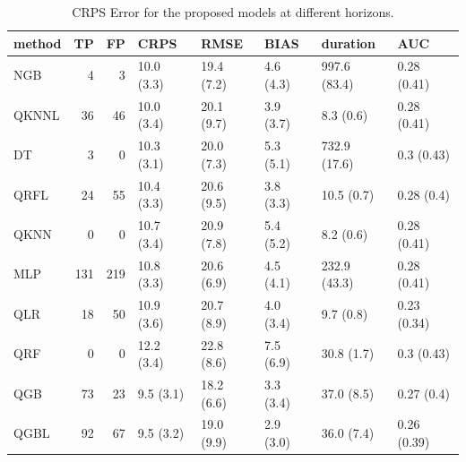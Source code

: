 \documentclass[a4paper,3p,sort&compress]{elsarticle}
\begin{document}
\begin{table}[tbp]
  \centering \footnotesize
  \caption{\label{tab:determ}CRPS Error for the proposed models at different
    horizons.}
    \begin{tabular}{lrrlllll}
      \toprule
        method &  TP &  FP &        CRPS &        RMSE &       BIAS &      duration &          AUC \\
        \midrule
        NGB &             4 &               3 &  10.0 \tiny{(3.3)}&  19.4 \tiny{(7.2)}&  4.6 \tiny{(4.3)}&  997.6 \tiny{(83.4)}&  0.28 \tiny{(0.41)}\\
          QKNNL &            36 &              46 &  10.0 \tiny{(3.4)}&  20.1 \tiny{(9.7)}&  3.9 \tiny{(3.7)}&     8.3 \tiny{(0.6)}&  0.28 \tiny{(0.41)}\\
             DT &             3 &               0 &  10.3 \tiny{(3.1)}&  20.0 \tiny{(7.3)}&  5.3 \tiny{(5.1)}&  732.9 \tiny{(17.6)}&   0.3 \tiny{(0.43)}\\
           QRFL &            24 &              55 &  10.4 \tiny{(3.3)}&  20.6 \tiny{(9.5)}&  3.8 \tiny{(3.3)}&    10.5 \tiny{(0.7)}&   0.28 \tiny{(0.4)}\\
           QKNN &             0 &               0 &  10.7 \tiny{(3.4)}&  20.9 \tiny{(7.8)}&  5.4 \tiny{(5.2)}&     8.2 \tiny{(0.6)}&  0.28 \tiny{(0.41)}\\
            MLP &           131 &             219 &  10.8 \tiny{(3.3)}&  20.6 \tiny{(6.9)}&  4.5 \tiny{(4.1)}&  232.9 \tiny{(43.3)}&  0.28 \tiny{(0.41)}\\
            QLR &            18 &              50 &  10.9 \tiny{(3.6)}&  20.7 \tiny{(8.9)}&  4.0 \tiny{(3.4)}&     9.7 \tiny{(0.8)}&  0.23 \tiny{(0.34)}\\
            QRF &             0 &               0 &  12.2 \tiny{(3.4)}&  22.8 \tiny{(8.6)}&  7.5 \tiny{(6.9)}&    30.8 \tiny{(1.7)}&   0.3 \tiny{(0.43)}\\
            QGB &            73 &              23 &   9.5 \tiny{(3.1)}&  18.2 \tiny{(6.6)}&  3.3 \tiny{(3.4)}&    37.0 \tiny{(8.5)}&   0.27 \tiny{(0.4)}\\
           QGBL &            92 &              67 &   9.5 \tiny{(3.2)}&  19.0 \tiny{(9.9)}&  2.9 \tiny{(3.0)}&    36.0 \tiny{(7.4)}&  0.26 \tiny{(0.39)}\\
       \bottomrule
      \end{tabular}

      
\end{table}
\end{document}
